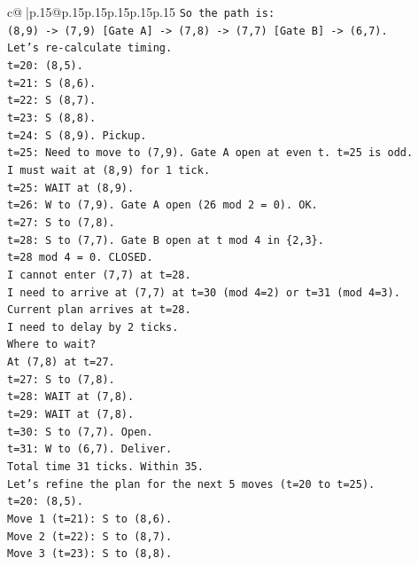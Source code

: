 \documentclass{article}
\begin{document}
{\begin{supertabular}{c@{$\;$}|p{.15\linewidth}@{}p{.15\linewidth}p{.15\linewidth}p{.15\linewidth}p{.15\linewidth}p{.15\linewidth}}
{{{\texttt{So the path is:} \\
\texttt{(8,9) {-}> (7,9) {[}Gate A{]} {-}> (7,8) {-}> (7,7) {[}Gate B{]} {-}> (6,7).} \\
\texttt{Let's re{-}calculate timing.} \\
\texttt{t=20: (8,5).} \\
\texttt{t=21: S (8,6).} \\
\texttt{t=22: S (8,7).} \\
\texttt{t=23: S (8,8).} \\
\texttt{t=24: S (8,9). Pickup.} \\
\texttt{t=25: Need to move to (7,9). Gate A open at even t. t=25 is odd.} \\
\texttt{I must wait at (8,9) for 1 tick.} \\
\texttt{t=25: WAIT at (8,9).} \\
\texttt{t=26: W to (7,9). Gate A open (26 mod 2 = 0). OK.} \\
\texttt{t=27: S to (7,8).} \\
\texttt{t=28: S to (7,7). Gate B open at t mod 4 in \{2,3\}.} \\
\texttt{t=28 mod 4 = 0. CLOSED.} \\
\texttt{I cannot enter (7,7) at t=28.} \\
\texttt{I need to arrive at (7,7) at t=30 (mod 4=2) or t=31 (mod 4=3).} \\
\texttt{Current plan arrives at t=28.} \\
\texttt{I need to delay by 2 ticks.} \\
\texttt{Where to wait?} \\
\texttt{At (7,8) at t=27.} \\
\texttt{t=27: S to (7,8).} \\
\texttt{t=28: WAIT at (7,8).} \\
\texttt{t=29: WAIT at (7,8).} \\
\texttt{t=30: S to (7,7). Open.} \\
\texttt{t=31: W to (6,7). Deliver.} \\
\texttt{Total time 31 ticks. Within 35.} \\
\texttt{Let's refine the plan for the next 5 moves (t=20 to t=25).} \\
\texttt{t=20: (8,5).} \\
\texttt{Move 1 (t=21): S to (8,6).} \\
\texttt{Move 2 (t=22): S to (8,7).} \\
\texttt{Move 3 (t=23): S to (8,8).} \\
}}}
\end{supertabular}}
\end{document}
